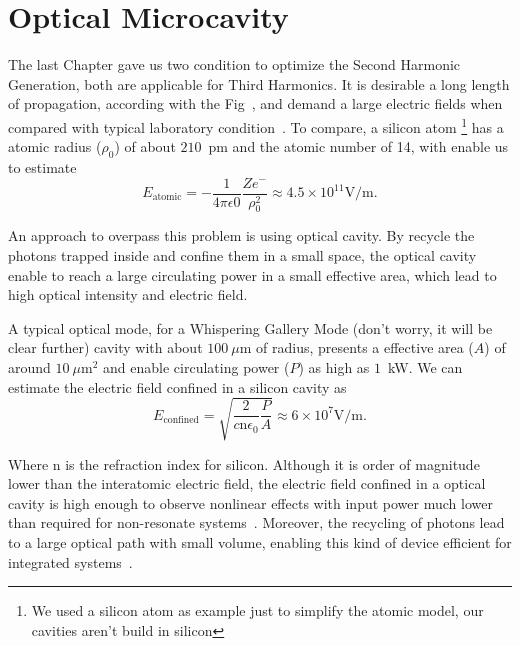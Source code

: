 \chapter{Optical Microcavity}
\label{chap:3_optical_cavity}

The last Chapter gave us two condition to optimize the Second Harmonic Generation, both are applicable for Third Harmonics\cite{Boyd2003}. It is desirable a long length of propagation, according with the Fig~, and demand a large electric fields when compared with typical laboratory condition~\cite{Grubsky2005}. To compare, a silicon atom \footnote{We used a silicon atom as example just to simplify the atomic model, our cavities aren't build in silicon} has a atomic radius ($\rho_0$) of about $210$~pm and the atomic number of 14, with enable us to estimate   
\begin{equation}
   E_\text{atomic} = -\frac{1}{4 \pi \epsilon0}\frac{Z e^-}{\rho_0^2} %
    \approx 4.5\times10^{11}\text{V/m}.
\end{equation}

An approach to overpass this problem is using optical cavity. By recycle the photons trapped inside and confine them in a small space, the optical cavity enable to reach a large circulating power in a small effective area, which lead to high optical intensity and electric field. 

A typical optical mode, for a Whispering Gallery Mode (don't worry, it will be clear further) cavity with about $100~\mu$m of radius, presents a effective area ($A$) of around $10~\mu$m$^2$ and enable circulating power ($P$) as high as $1$~kW. We can estimate the electric field confined in a silicon cavity as 
\begin{equation}
    E_\text{confined} = \sqrt{\frac{2}{c\text{n}\epsilon_0}\frac{P}{A}} \approx 6 \times 10^7\text{V/m}.
\end{equation}

Where $\text{n}$ is the refraction index for silicon. Although it is order of magnitude lower than the interatomic electric field, the electric field confined in a optical cavity is high enough to observe nonlinear effects with input power much lower than required for non-resonate systems~\cite{Carmon2006,Farnesi2014,Chen-jinnai2012}. Moreover, the recycling of photons lead to a large optical path with small volume, enabling this kind of device efficient for integrated systems~\cite{Surya2018, Yang2018}.  

